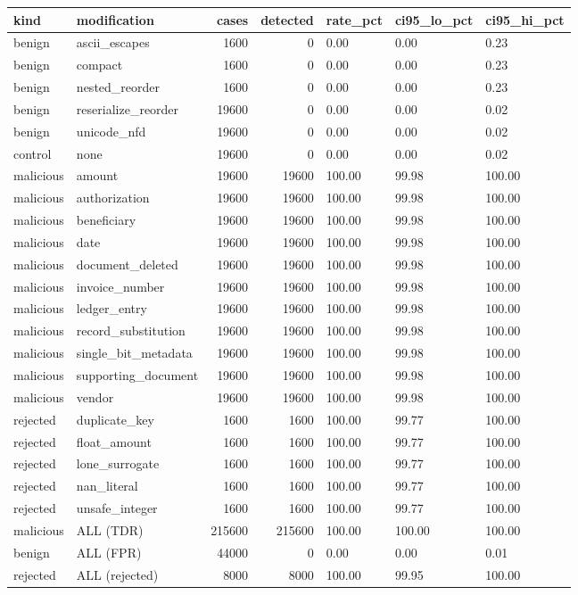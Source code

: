 \begin{tabular}{llrrlll}
\toprule
kind & modification & cases & detected & rate\_pct & ci95\_lo\_pct & ci95\_hi\_pct \\
\midrule
benign & ascii\_escapes & 1600 & 0 & 0.00 & 0.00 & 0.23 \\
benign & compact & 1600 & 0 & 0.00 & 0.00 & 0.23 \\
benign & nested\_reorder & 1600 & 0 & 0.00 & 0.00 & 0.23 \\
benign & reserialize\_reorder & 19600 & 0 & 0.00 & 0.00 & 0.02 \\
benign & unicode\_nfd & 19600 & 0 & 0.00 & 0.00 & 0.02 \\
control & none & 19600 & 0 & 0.00 & 0.00 & 0.02 \\
malicious & amount & 19600 & 19600 & 100.00 & 99.98 & 100.00 \\
malicious & authorization & 19600 & 19600 & 100.00 & 99.98 & 100.00 \\
malicious & beneficiary & 19600 & 19600 & 100.00 & 99.98 & 100.00 \\
malicious & date & 19600 & 19600 & 100.00 & 99.98 & 100.00 \\
malicious & document\_deleted & 19600 & 19600 & 100.00 & 99.98 & 100.00 \\
malicious & invoice\_number & 19600 & 19600 & 100.00 & 99.98 & 100.00 \\
malicious & ledger\_entry & 19600 & 19600 & 100.00 & 99.98 & 100.00 \\
malicious & record\_substitution & 19600 & 19600 & 100.00 & 99.98 & 100.00 \\
malicious & single\_bit\_metadata & 19600 & 19600 & 100.00 & 99.98 & 100.00 \\
malicious & supporting\_document & 19600 & 19600 & 100.00 & 99.98 & 100.00 \\
malicious & vendor & 19600 & 19600 & 100.00 & 99.98 & 100.00 \\
rejected & duplicate\_key & 1600 & 1600 & 100.00 & 99.77 & 100.00 \\
rejected & float\_amount & 1600 & 1600 & 100.00 & 99.77 & 100.00 \\
rejected & lone\_surrogate & 1600 & 1600 & 100.00 & 99.77 & 100.00 \\
rejected & nan\_literal & 1600 & 1600 & 100.00 & 99.77 & 100.00 \\
rejected & unsafe\_integer & 1600 & 1600 & 100.00 & 99.77 & 100.00 \\
malicious & ALL (TDR) & 215600 & 215600 & 100.00 & 100.00 & 100.00 \\
benign & ALL (FPR) & 44000 & 0 & 0.00 & 0.00 & 0.01 \\
rejected & ALL (rejected) & 8000 & 8000 & 100.00 & 99.95 & 100.00 \\
\bottomrule
\end{tabular}

